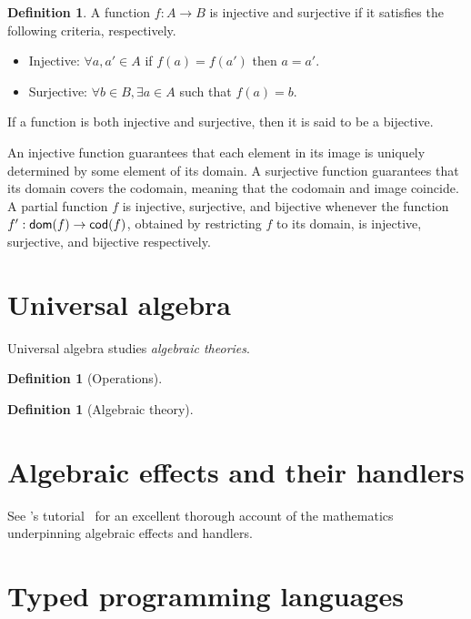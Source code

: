 \documentclass[12pt,phd,lfcs,twoside,openright,logo,leftchapter,normalheadings]{infthesis}
\theoremstyle{plain}
\theoremstyle{definition}
\newtheorem{definition}[theorem]{Definition}
\begin{document}
\begin{definition}
  A function $f : A \to B$ is injective and surjective if it satisfies
  the following criteria, respectively.
  \begin{itemize}
    \item Injective: $\forall a,a' \in A$ if $f(a) = f(a')$ then $a = a'$.
    \item Surjective: $\forall b \in B,\exists a \in A$ such that $f(a) = b$.
  \end{itemize}
  If a function is both injective and surjective, then it is said to
  be a bijective.
\end{definition}
%
An injective function guarantees that each element in its image is
uniquely determined by some element of its domain.
%
A surjective function guarantees that its domain covers the codomain,
meaning that the codomain and image coincide.
%
A partial function $f$ is injective, surjective, and bijective
whenever the function $f' : \mathsf{dom}(f) \to \mathsf{cod}(f)$, obtained by
restricting $f$ to its domain, is injective, surjective, and bijective
respectively.

\section{Universal algebra}
\label{sec:universal-algebra}

Universal algebra studies \emph{algebraic theories}.

\begin{definition}[Operations]
  
\end{definition}

\begin{definition}[Algebraic theory]\label{def:algebra}
  
\end{definition}

\section{Algebraic effects and their handlers}
\label{sec:algebraic-effects}

See \citeauthor{Bauer18}'s tutorial~\cite{Bauer18} for an excellent
thorough account of the mathematics underpinning algebraic effects and
handlers.

\section{Typed programming languages}
\label{sec:pls}
%
\end{document}
